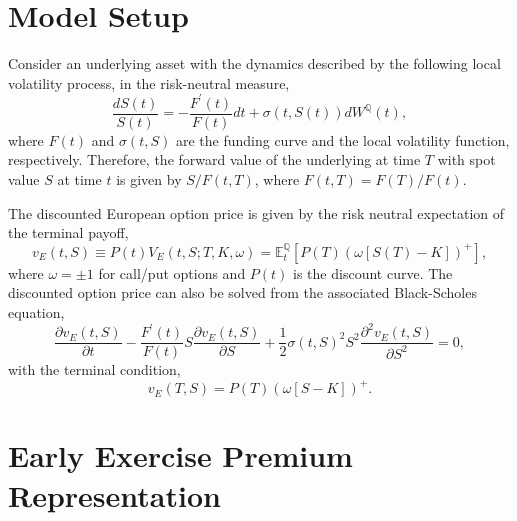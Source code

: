 \documentclass[12pt]{article}
\begin{document}
  \section{Model Setup}

    Consider an underlying asset with the dynamics described by the following local volatility process,
    in the risk-neutral measure,
    \begin{equation}
      \frac{dS(t)}{S(t)}=-\frac{F^{\prime}(t)}{F(t)}dt+\sigma\left(t, S(t)\right)dW^{\mathbb Q}(t),
    \end{equation}
    where $F(t)$ and $\sigma(t, S)$ are the funding curve and the local volatility function, respectively.
    Therefore, the forward value of the underlying at time $T$ with spot value $S$ at time $t$ is given by
    $S/F(t,T)$, where $F(t,T)=F(T)/F(t)$.

    The discounted European option price is given by the risk neutral expectation of the terminal payoff,
    \begin{equation}
      \label{Euro0}
      v_E(t,S) \equiv P(t)V_E(t,S;T,K,\omega) = {\mathbb E}_t^{\mathbb Q}\left[P(T)\left(\omega[S(T)-K]\right)^+\right],
    \end{equation}
    where $\omega=\pm 1$ for call/put options and $P(t)$ is the discount curve. The discounted option
    price can also be solved from the associated Black-Scholes equation,
    \begin{equation}
      \frac{\partial v_E(t,S)}{\partial t}-\frac{F^{\prime}(t)}{F(t)}S\frac{\partial v_E(t,S)}{\partial S}
         +\frac{1}{2}\sigma(t,S)^2S^2\frac{\partial^2 v_E(t,S)}{\partial S^2}=0,
    \end{equation}
    with the terminal condition,
    \begin{equation}
      v_E(T,S) = P(T)\left(\omega[S-K]\right)^+.
    \end{equation}



  \section{Early Exercise Premium Representation}
\end{document}
